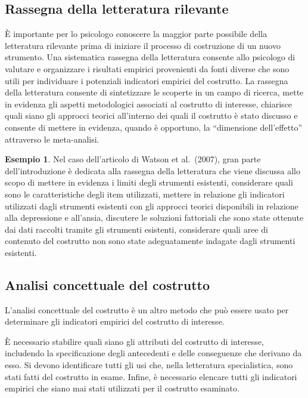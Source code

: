 \documentclass[
  11pt,
]{krantz}
\theoremstyle{definition}
\theoremstyle{definition}
\newtheorem{example}{Esempio}[chapter]
\theoremstyle{definition}
\theoremstyle{definition}
\theoremstyle{remark}
\begin{document}
\hypertarget{rassegna-della-letteratura-rilevante}{%
\subsection{Rassegna della letteratura rilevante}\label{rassegna-della-letteratura-rilevante}}

È importante per lo psicologo conoscere la maggior parte possibile della letteratura rilevante prima di iniziare il processo di costruzione di un nuovo strumento. Una sistematica rassegna della letteratura consente allo psicologo di valutare e organizzare i risultati empirici provenienti da fonti diverse che sono utili per individuare i potenziali indicatori empirici del costrutto. La rassegna della letteratura consente di sintetizzare le scoperte in un campo di ricerca, mette in evidenza gli aspetti metodologici associati al costrutto di interesse, chiarisce quali siano gli approcci teorici all'interno dei quali il costrutto è stato discusso e consente di mettere in evidenza, quando è opportuno, la ``dimensione dell'effetto'' attraverso le meta-analisi.

\begin{example}
Nel caso dell'articolo di Watson et al.~(2007), gran parte dell'introduzione è dedicata alla rassegna della letteratura che viene discussa allo scopo di mettere in evidenza i limiti degli strumenti esistenti, considerare quali sono le caratteristiche degli item utilizzati, mettere in relazione gli indicatori utilizzati dagli strumenti esistenti con gli approcci teorici disponibili in relazione alla depressione e all'ansia, discutere le soluzioni fattoriali che sono state ottenute dai dati raccolti tramite gli strumenti esistenti, considerare quali aree di contenuto del costrutto non sono state adeguatamente indagate dagli strumenti esistenti.
\end{example}

\hypertarget{analisi-concettuale-del-costrutto}{%
\subsection{Analisi concettuale del costrutto}\label{analisi-concettuale-del-costrutto}}

L'analisi concettuale del costrutto è un altro metodo che può essere usato per determinare gli indicatori empirici del costrutto di interesse.

È necessario stabilire quali siano gli attributi del costrutto di interesse, includendo la specificazione degli antecedenti e delle conseguenze che derivano da esso. Si devono identificare tutti gli usi che, nella letteratura specialistica, sono stati fatti del costrutto in esame. Infine, è necessario elencare tutti gli indicatori empirici che siano mai stati utilizzati per il costrutto esaminato.
\end{document}
